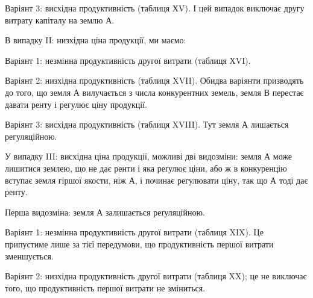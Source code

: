 Варіянт 3: висхідна продуктивність (таблиця ХV). І цей випадок виключає
другу витрату капіталу на землю А.

В випадку II: низхідна ціна продукції, ми маємо:

Варіянт 1: незмінна продуктивність другої витрати (таблиця ХVI).

Варіянт 2: низхідна продуктивність (таблиця XVII). Обидва варіянти призводять
до того, що земля А вилучається з числа конкурентних земель, земля
В перестає давати ренту і регулює ціну продукції.

Варіянт 3: висхідна продуктивність (таблиця XVIII). Тут земля А лишається
регуляційною.

У випадку III: висхідна ціна продукції, можливі дві видозміни: земля
А може лишитися землею, що не дає ренти і яка реґулює ціни, або ж в конкуренцію
вступає земля гіршої якости, ніж А, і починає регулювати ціну, так що А
тоді дає ренту.

Перша видозміна: земля А залишається реґуляційною.

Варіянт 1: незмінна продуктивність другої витрати (таблиця XIX). Це припустиме
лише за тієї передумови, що продуктивність першої витрати
зменшується.

Варіянт 2: низхідна продуктивність другої витрати (таблиця XX); це не виключає
того, що продуктивність першої витрати не зміниться.
